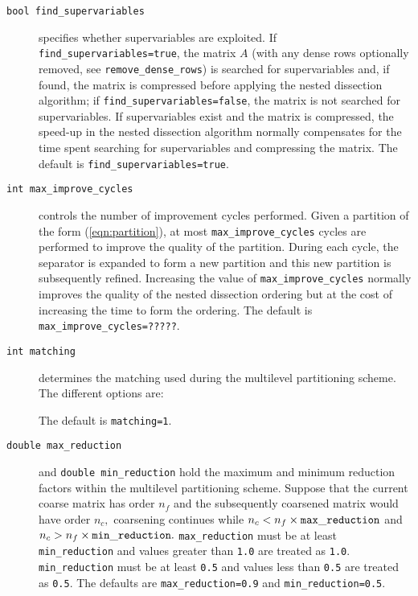 \begin{description}
\item[\texttt{bool find\_supervariables}] specifies whether supervariables are
exploited. If 
{\tt find\_supervariables=true}, the matrix $A$ (with any dense rows 
optionally removed, see {\tt remove\_dense\_rows}) is searched for 
supervariables and, if found, the matrix is compressed before applying the 
nested dissection algorithm; if {\tt find\_supervariables=false}, the matrix 
is not searched for supervariables. If supervariables exist and the matrix is 
compressed, the speed-up in the nested dissection algorithm normally 
compensates for the time spent searching for supervariables and compressing the
matrix. The default is {\tt find\_supervariables=true}.


\item[\texttt{int max\_improve\_cycles}] controls the number of improvement
cycles performed. Given a partition of the 
form (\ref{eqn:partition}), at most {\tt max\_improve\_cycles} cycles are 
performed to improve the quality of the partition. During each cycle, the 
separator is expanded to form a new partition and this new partition is 
subsequently refined. Increasing the value of {\tt max\_improve\_cycles} normally improves 
the quality of the nested dissection ordering but at the cost of increasing the 
time to form the ordering. The default is {\tt max\_improve\_cycles=?????}.

\item[\texttt{int matching}] determines the matching used during the multilevel partitioning scheme. The different options are: 
The default is {\tt matching=1}.

\item[\texttt{double max\_reduction}] and {\tt double min\_reduction} hold the maximum and minimum reduction factors within the multilevel partitioning scheme. Suppose that the current coarse matrix has order $n_f$ and 
the subsequently coarsened matrix would have order $n_c,$ coarsening continues while $n_c<n_f\times{\tt max\_reduction}$ and 
$n_c>n_f\times{\tt min\_reduction}.$ {\tt max\_reduction} must be at least {\tt min\_reduction} and values greater than 
{\tt 1.0} are treated as {\tt 1.0}. {\tt min\_reduction} must be at least {\tt 0.5} and values less than 
{\tt 0.5} are treated as {\tt 0.5}. The defaults are {\tt max\_reduction=0.9} and {\tt min\_reduction=0.5}.


\end{description}

